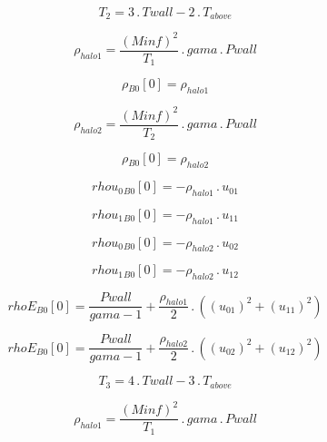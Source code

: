 \documentclass{article}
\begin{document}
\begin{dmath}T_{2} = 3 \,.\, Twall - 2 \,.\, T_{above}\end{dmath}

\begin{dmath}\rho_{halo 1} = \frac{\left(Minf \right)^{2}}{T_{1}} \,.\, gama \,.\, Pwall\end{dmath}

\begin{dmath}{\rho{_{B0}}}[{0}] = \rho_{halo 1}\end{dmath}

\begin{dmath}\rho_{halo 2} = \frac{\left(Minf \right)^{2}}{T_{2}} \,.\, gama \,.\, Pwall\end{dmath}

\begin{dmath}{\rho{_{B0}}}[{0}] = \rho_{halo 2}\end{dmath}

\begin{dmath}{rhou_{0}{_{B0}}}[{0}] = - \rho_{halo 1} \,.\, u_{01}\end{dmath}

\begin{dmath}{rhou_{1}{_{B0}}}[{0}] = - \rho_{halo 1} \,.\, u_{11}\end{dmath}

\begin{dmath}{rhou_{0}{_{B0}}}[{0}] = - \rho_{halo 2} \,.\, u_{02}\end{dmath}

\begin{dmath}{rhou_{1}{_{B0}}}[{0}] = - \rho_{halo 2} \,.\, u_{12}\end{dmath}

\begin{dmath}{rhoE{_{B0}}}[{0}] = \frac{Pwall}{gama - 1} + \frac{\rho_{halo 1}}{2} \,.\, \left(\left(u_{01} \right)^{2} + \left(u_{11} \right)^{2}\right)\end{dmath}

\begin{dmath}{rhoE{_{B0}}}[{0}] = \frac{Pwall}{gama - 1} + \frac{\rho_{halo 2}}{2} \,.\, \left(\left(u_{02} \right)^{2} + \left(u_{12} \right)^{2}\right)\end{dmath}

\begin{dmath}T_{3} = 4 \,.\, Twall - 3 \,.\, T_{above}\end{dmath}

\begin{dmath}\rho_{halo 1} = \frac{\left(Minf \right)^{2}}{T_{1}} \,.\, gama \,.\, Pwall\end{dmath}
\end{document}
